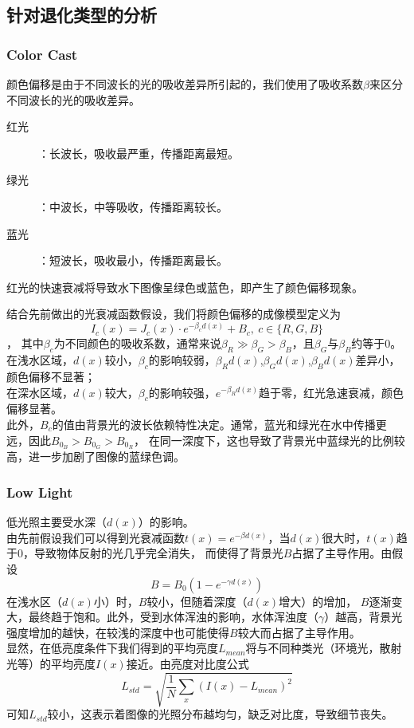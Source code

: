 \documentclass[11pt]{ctexart}
\begin{document}
    \subsection{针对退化类型的分析}
    \subsubsection{Color Cast}
    颜色偏移是由于不同波长的光的吸收差异所引起的，我们使用了吸收系数$\beta $来区分不同波长的光的吸收差异。
    \begin{description}
        \item [红光]：长波长，吸收最严重，传播距离最短。
        \item [绿光]：中波长，中等吸收，传播距离较长。
        \item [蓝光]：短波长，吸收最小，传播距离最长。
    \end{description}
    红光的快速衰减将导致水下图像呈绿色或蓝色，即产生了颜色偏移现象。


    结合先前做出的光衰减函数假设，我们将颜色偏移的成像模型定义为\[I_c(x) = J_c(x) \cdot e^{-\beta_c d(x)} + B_c,\ c\in \{R,G,B\}\]，
    其中$\beta_c$为不同颜色的吸收系数，通常来说$\beta_R \gg \beta_G > \beta_B $，且$\beta_G$与$\beta_B$约等于0。
    在浅水区域，$d(x)$较小，$\beta_c$的影响较弱，$\beta_Rd(x)$,$\beta_Gd(x)$,$\beta_Bd(x)$差异小，颜色偏移不显著；\\
    在深水区域，$d(x)$较大，$\beta_c$的影响较强，$e^{-\beta_Rd(x)}$趋于零，红光急速衰减，颜色偏移显著。\\
    此外，$B_c$的值由背景光的波长依赖特性决定。通常，蓝光和绿光在水中传播更远，因此$B_{0_B} > B_{0_G} > B_{0_R}$，
    在同一深度下，这也导致了背景光中蓝绿光的比例较高，进一步加剧了图像的蓝绿色调。

    \subsubsection{Low Light}
    低光照主要受水深（$d(x)$）的影响。\\
    由先前假设我们可以得到光衰减函数$t(x)=e^{-\beta d(x)}$，当$d(x)$很大时，$t(x)$趋于0，导致物体反射的光几乎完全消失，
    而使得了背景光$B$占据了主导作用。由假设\[B=B_0(1-e^{-\gamma d(x)})\]在浅水区（$d(x)$小）时，$B$较小，但随着深度（$d(x)$增大）的增加，
    $B$逐渐变大，最终趋于饱和。此外，受到水体浑浊的影响，水体浑浊度（$\gamma$）越高，背景光强度增加的越快，在较浅的深度中也可能使得$B$较大而占据了主导作用。\\
    显然，在低亮度条件下我们得到的平均亮度$L_{mean}$将与不同种类光（环境光，散射光等）的平均亮度$I(x)$接近。由亮度对比度公式
    \[L_{std} = \sqrt{\frac{1}{N} \sum_{x} (I(x) - L_{mean})^2}\]
    可知$L_{std}$较小，这表示着图像的光照分布越均匀，缺乏对比度，导致细节丧失。
\end{document}
